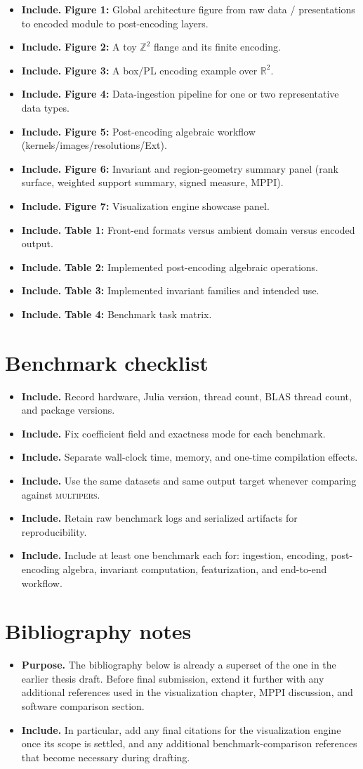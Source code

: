 \documentclass[11pt]{article}
\newcommand{\R}{\mathbb{R}}
\newcommand{\multipers}{\textsc{multipers}}
\newenvironment{plan}{\begin{itemize}[leftmargin=1.6em,itemsep=0.35em,topsep=0.25em]}{\end{itemize}}
\newcommand{\purpose}[1]{\item \textbf{Purpose.} #1}
\newcommand{\includeitems}[1]{\item \textbf{Include.} #1}
\begin{document}
\begin{plan}
    \includeitems{\textbf{Figure 1:} Global architecture figure from raw data / presentations to encoded module to post-encoding layers.}
    \includeitems{\textbf{Figure 2:} A toy $\mathbb{Z}^2$ flange and its finite encoding.}
    \includeitems{\textbf{Figure 3:} A box/PL encoding example over $\R^2$.}
    \includeitems{\textbf{Figure 4:} Data-ingestion pipeline for one or two representative data types.}
    \includeitems{\textbf{Figure 5:} Post-encoding algebraic workflow (kernels/images/resolutions/Ext).}
    \includeitems{\textbf{Figure 6:} Invariant and region-geometry summary panel (rank surface, weighted support summary, signed measure, MPPI).}
    \includeitems{\textbf{Figure 7:} Visualization engine showcase panel.}
    \includeitems{\textbf{Table 1:} Front-end formats versus ambient domain versus encoded output.}
    \includeitems{\textbf{Table 2:} Implemented post-encoding algebraic operations.}
    \includeitems{\textbf{Table 3:} Implemented invariant families and intended use.}
    \includeitems{\textbf{Table 4:} Benchmark task matrix.}
\end{plan}

\section{Benchmark checklist}\label{app:benchmark-checklist}

\begin{plan}
    \includeitems{Record hardware, Julia version, thread count, BLAS thread count, and package versions.}
    \includeitems{Fix coefficient field and exactness mode for each benchmark.}
    \includeitems{Separate wall-clock time, memory, and one-time compilation effects.}
    \includeitems{Use the same datasets and same output target whenever comparing against \multipers{}.}
    \includeitems{Retain raw benchmark logs and serialized artifacts for reproducibility.}
    \includeitems{Include at least one benchmark each for: ingestion, encoding, post-encoding algebra, invariant computation, featurization, and end-to-end workflow.}
\end{plan}

\section{Bibliography notes}\label{app:bibliography-notes}

\begin{plan}
    \purpose{The bibliography below is already a superset of the one in the earlier thesis draft. Before final submission, extend it further with any additional references used in the visualization chapter, MPPI discussion, and software comparison section.}
    \includeitems{In particular, add any final citations for the visualization engine once its scope is settled, and any additional benchmark-comparison references that become necessary during drafting.}
\end{plan}
\end{document}
